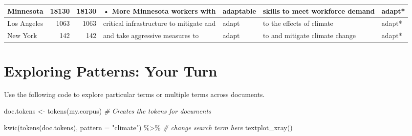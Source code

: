 \documentclass[
]{article}
\newenvironment{Shaded}{\begin{snugshade}}{\end{snugshade}}
\newcommand{\AttributeTok}[1]{\textcolor[rgb]{0.77,0.63,0.00}{#1}}
\newcommand{\CommentTok}[1]{\textcolor[rgb]{0.56,0.35,0.01}{\textit{#1}}}
\newcommand{\FunctionTok}[1]{\textcolor[rgb]{0.00,0.00,0.00}{#1}}
\newcommand{\NormalTok}[1]{#1}
\newcommand{\OtherTok}[1]{\textcolor[rgb]{0.56,0.35,0.01}{#1}}
\newcommand{\SpecialCharTok}[1]{\textcolor[rgb]{0.00,0.00,0.00}{#1}}
\newcommand{\StringTok}[1]{\textcolor[rgb]{0.31,0.60,0.02}{#1}}
\begin{document}
\begin{table}
\begin{tabular}[t]{l|r|r|l|l|l|l}
\hline
Minnesota & 18130 & 18130 & • More Minnesota workers with & adaptable & skills to meet workforce demand & adapt*\\
\hline
Los Angeles & 1063 & 1063 & critical infrastructure to mitigate and & adapt & to the effects of climate & adapt*\\
\hline
New York & 142 & 142 & and take aggressive measures to & adapt & to and mitigate climate change & adapt*\\
\hline
\end{tabular}
\end{table}

\hypertarget{exploring-patterns-your-turn}{%
\section{Exploring Patterns: Your
Turn}\label{exploring-patterns-your-turn}}

Use the following code to explore particular terms or multiple terms
across documents.

\begin{Shaded}
\begin{Highlighting}[]
\NormalTok{doc.tokens }\OtherTok{\textless{}{-}} \FunctionTok{tokens}\NormalTok{(my.corpus) }\CommentTok{\# Creates the tokens for documents}

\FunctionTok{kwic}\NormalTok{(}\FunctionTok{tokens}\NormalTok{(doc.tokens), }\AttributeTok{pattern =} \StringTok{"climate"}\NormalTok{) }\SpecialCharTok{\%\textgreater{}\%} \CommentTok{\# change search term here}
  \FunctionTok{textplot\_xray}\NormalTok{()}
\end{Highlighting}
\end{Shaded}
\end{document}
